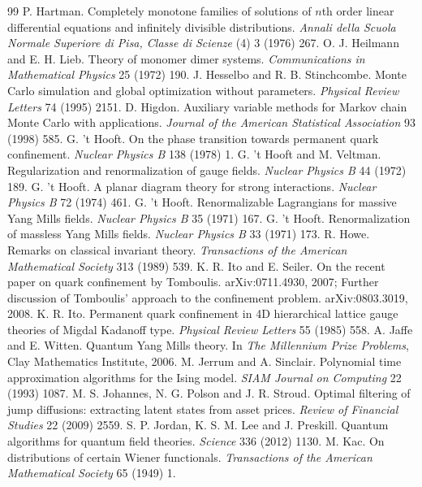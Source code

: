 \begin{thebibliography}{99}
 P. Hartman. Completely monotone families of solutions of $n$th order linear differential equations and infinitely divisible distributions. \emph{Annali della Scuola Normale Superiore di Pisa, Classe di Scienze} (4) 3 (1976) 267.
 O. J. Heilmann and E. H. Lieb. Theory of monomer dimer systems. \emph{Communications in Mathematical Physics} 25 (1972) 190.
 J. Hesselbo and R. B. Stinchcombe. Monte Carlo simulation and global optimization without parameters. \emph{Physical Review Letters} 74 (1995) 2151.
 D. Higdon. Auxiliary variable methods for Markov chain Monte Carlo with applications. \emph{Journal of the American Statistical Association} 93 (1998) 585.
 G. 't Hooft. On the phase transition towards permanent quark confinement. \emph{Nuclear Physics B} 138 (1978) 1.
 G. 't Hooft and M. Veltman. Regularization and renormalization of gauge fields. \emph{Nuclear Physics B} 44 (1972) 189.
 G. 't Hooft. A planar diagram theory for strong interactions. \emph{Nuclear Physics B} 72 (1974) 461.
 G. 't Hooft. Renormalizable Lagrangians for massive Yang Mills fields. \emph{Nuclear Physics B} 35 (1971) 167.
 G. 't Hooft. Renormalization of massless Yang Mills fields. \emph{Nuclear Physics B} 33 (1971) 173.
 R. Howe. Remarks on classical invariant theory. \emph{Transactions of the American Mathematical Society} 313 (1989) 539.
 K. R. Ito and E. Seiler. On the recent paper on quark confinement by Tomboulis. arXiv:0711.4930, 2007; Further discussion of Tomboulis' approach to the confinement problem. arXiv:0803.3019, 2008.
 K. R. Ito. Permanent quark confinement in 4D hierarchical lattice gauge theories of Migdal Kadanoff type. \emph{Physical Review Letters} 55 (1985) 558.
 A. Jaffe and E. Witten. Quantum Yang Mills theory. In \emph{The Millennium Prize Problems}, Clay Mathematics Institute, 2006.
 M. Jerrum and A. Sinclair. Polynomial time approximation algorithms for the Ising model. \emph{SIAM Journal on Computing} 22 (1993) 1087.
 M. S. Johannes, N. G. Polson and J. R. Stroud. Optimal filtering of jump diffusions: extracting latent states from asset prices. \emph{Review of Financial Studies} 22 (2009) 2559.
 S. P. Jordan, K. S. M. Lee and J. Preskill. Quantum algorithms for quantum field theories. \emph{Science} 336 (2012) 1130.
 M. Kac. On distributions of certain Wiener functionals. \emph{Transactions of the American Mathematical Society} 65 (1949) 1.

\end{thebibliography}
